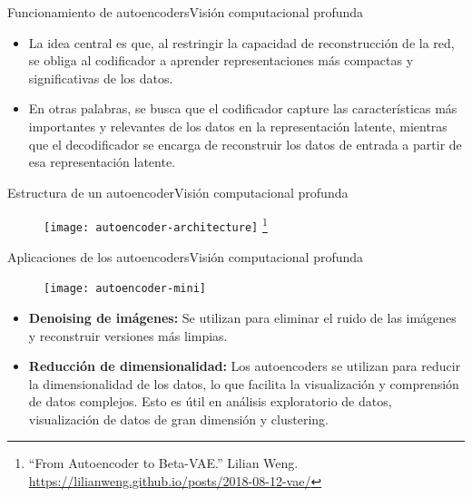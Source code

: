 \documentclass[10pt,border=3pt,tikz]{beamer}
\begin{document}
    \begin{frame}{Funcionamiento de autoencoders}{Visión computacional profunda}
        \begin{itemize}
            \item La idea central es que, al restringir la capacidad de reconstrucción de la red, se obliga al codificador a aprender representaciones más compactas y significativas de los datos. 
            
            \item En otras palabras, se busca que el codificador capture las características más importantes y relevantes de los datos en la representación latente, mientras que el decodificador se encarga de reconstruir los datos de entrada a partir de esa representación latente.
        \end{itemize}
    \end{frame}
    
    \begin{frame}{Estructura de un autoencoder}{Visión computacional profunda}
        \begin{figure}
            \centering
            \texttt{[image: autoencoder-architecture]}
            \let\thefootnote\relax\footnote{{\tiny “From Autoencoder to Beta-VAE.” Lilian Weng. \url{https://lilianweng.github.io/posts/2018-08-12-vae/}}}
        \end{figure}
    \end{frame}
    
    \begin{frame}{Aplicaciones de los autoencoders}{Visión computacional profunda}
        \begin{figure}
            \centering
            \texttt{[image: autoencoder-mini]}
        \end{figure}
        \begin{itemize}
            \item \textbf{Denoising de imágenes:} Se utilizan para eliminar el ruido de las imágenes y reconstruir versiones más limpias.
            \item \textbf{Reducción de dimensionalidad:} Los autoencoders se utilizan para reducir la dimensionalidad de los datos, lo que facilita la visualización y comprensión de datos complejos. Esto es útil en análisis exploratorio de datos, visualización de datos de gran dimensión y clustering.
        \end{itemize}
    \end{frame}
    
\end{document}
